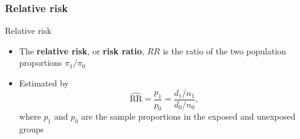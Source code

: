 \documentclass[compress, notes=hide]{beamer}
\newcommand{\hl}[1]{\textbf{#1}}
\begin{document}



\begin{frame}
		  \frametitle{Relative risk} 
\begin{block}{Relative risk}
\begin{itemize}
\item The \hl{relative risk}, or \hl{risk ratio}, $RR$
  is the ratio of the two population proportions $\pi_1/\pi_0$
\item Estimated by
\begin{equation}
\widehat{\mathrm{RR}} = \frac{p_1}{p_0} = \frac{d_1/n_1}{d_0/n_0},\nonumber
\end{equation}
where $p_1$ and $p_0$ are the sample proportions in the exposed and
unexposed groups
\end{itemize}
\end{block}
\end{frame}
\end{document}
